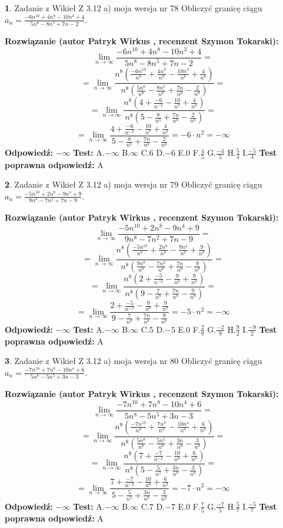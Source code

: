 \documentclass[12pt, a4paper]{article}
\theoremstyle{definition} %
\newtheorem{zad}{}
\newcommand{\zadStart}[1]{\begin{zad}#1\newline}
\newcommand{\zadStop}{\end{zad}}
\newcommand{\rozwStart}[2]{\noindent \textbf{Rozwiązanie (autor #1 , recenzent #2): }\newline}
\newcommand{\rozwStop}{\newline}
\newcommand{\odpStart}{\noindent \textbf{Odpowiedź:}\newline}
\newcommand{\odpStop}{\newline}
\newcommand{\testStart}{\noindent \textbf{Test:}\newline}
\newcommand{\testStop}{\newline}
\newcommand{\kluczStart}{\noindent \textbf{Test poprawna odpowiedź:}\newline}
\newcommand{\kluczStop}{\newline}
\begin{document}
\zadStart{Zadanie z Wikieł Z 3.12 a) moja wersja nr 78}
Obliczyć granicę ciągu $a_{n}=\frac{-6n^{10}+4n^{8}-10n^{3}+4}{5n^{8}-8n^{5}+7n-2}$.
\zadStop
\rozwStart{Patryk Wirkus}{Szymon Tokarski}
$$\lim\limits_{n\to\infty}\frac{-6n^{10}+4n^{8}-10n^{3}+4}{5n^{8}-8n^{5}+7n-2}=$$
$$=\lim\limits_{n\to\infty}\frac{n^{8}\left(\frac{-6n^{10}}{n^{8}}+\frac{4n^{8}}{n^{8}}-\frac{10n^{3}}{n^{8}}+\frac{4}{n^{8}}\right)}{n^{8}\left(\frac{5n^{8}}{n^{8}}-\frac{8n^{5}}{n^{8}}+\frac{7n}{n^{8}}-\frac{2}{n^{8}}\right)}=$$
$$=\lim\limits_{n\to\infty}\frac{n^{8}\left(4+\frac{-6}{n^{-2}}-\frac{10}{n^{7}}+\frac{4}{n^{8}}\right)}
{n^{8}\left(5-\frac{8}{n^{5}}+\frac{7n}{n^{8}}-\frac{2}{n^{8}}\right)}=$$
$$=\lim\limits_{n\to\infty}\frac{4+\frac{-6}{n^{-2}}-\frac{10}{n^{7}}+\frac{4}{n^{8}}}{5-\frac{8}{n^{5}}+\frac{7n}{n^{8}}-\frac{2}{n^{8}}}=-6\cdot n^{2} = -\infty$$
\rozwStop
\odpStart
$-\infty$
\odpStop
\testStart
A.$-\infty$
B.$\infty$
C.$6$
D.$-6$
E.$0$
F.$\frac{4}{5}$
G.$\frac{-4}{5}$
H.$\frac{5}{4}$
I.$\frac{-5}{4}$
\testStop
\kluczStart
A
\kluczStop



\zadStart{Zadanie z Wikieł Z 3.12 a) moja wersja nr 79}
Obliczyć granicę ciągu $a_{n}=\frac{-5n^{10}+2n^{8}-9n^{4}+9}{9n^{8}-7n^{2}+7n-9}$.
\zadStop
\rozwStart{Patryk Wirkus}{Szymon Tokarski}
$$\lim\limits_{n\to\infty}\frac{-5n^{10}+2n^{8}-9n^{4}+9}{9n^{8}-7n^{2}+7n-9}=$$
$$=\lim\limits_{n\to\infty}\frac{n^{8}\left(\frac{-5n^{10}}{n^{8}}+\frac{2n^{8}}{n^{8}}-\frac{9n^{4}}{n^{8}}+\frac{9}{n^{8}}\right)}{n^{8}\left(\frac{9n^{8}}{n^{8}}-\frac{7n^{2}}{n^{8}}+\frac{7n}{n^{8}}-\frac{9}{n^{8}}\right)}=$$
$$=\lim\limits_{n\to\infty}\frac{n^{8}\left(2+\frac{-5}{n^{-2}}-\frac{9}{n^{6}}+\frac{9}{n^{8}}\right)}
{n^{8}\left(9-\frac{7}{n^{8}}+\frac{7n}{n^{8}}-\frac{9}{n^{8}}\right)}=$$
$$=\lim\limits_{n\to\infty}\frac{2+\frac{-5}{n^{-2}}-\frac{9}{n^{6}}+\frac{9}{n^{8}}}{9-\frac{7}{n^{8}}+\frac{7n}{n^{8}}-\frac{9}{n^{8}}}=-5\cdot n^{2} = -\infty$$
\rozwStop
\odpStart
$-\infty$
\odpStop
\testStart
A.$-\infty$
B.$\infty$
C.$5$
D.$-5$
E.$0$
F.$\frac{2}{9}$
G.$\frac{-2}{9}$
H.$\frac{9}{2}$
I.$\frac{-9}{2}$
\testStop
\kluczStart
A
\kluczStop



\zadStart{Zadanie z Wikieł Z 3.12 a) moja wersja nr 80}
Obliczyć granicę ciągu $a_{n}=\frac{-7n^{10}+7n^{8}-10n^{4}+6}{5n^{8}-5n^{5}+3n-3}$.
\zadStop
\rozwStart{Patryk Wirkus}{Szymon Tokarski}
$$\lim\limits_{n\to\infty}\frac{-7n^{10}+7n^{8}-10n^{4}+6}{5n^{8}-5n^{5}+3n-3}=$$
$$=\lim\limits_{n\to\infty}\frac{n^{8}\left(\frac{-7n^{10}}{n^{8}}+\frac{7n^{8}}{n^{8}}-\frac{10n^{4}}{n^{8}}+\frac{6}{n^{8}}\right)}{n^{8}\left(\frac{5n^{8}}{n^{8}}-\frac{5n^{5}}{n^{8}}+\frac{3n}{n^{8}}-\frac{3}{n^{8}}\right)}=$$
$$=\lim\limits_{n\to\infty}\frac{n^{8}\left(7+\frac{-7}{n^{-2}}-\frac{10}{n^{6}}+\frac{6}{n^{8}}\right)}
{n^{8}\left(5-\frac{5}{n^{5}}+\frac{3n}{n^{8}}-\frac{3}{n^{8}}\right)}=$$
$$=\lim\limits_{n\to\infty}\frac{7+\frac{-7}{n^{-2}}-\frac{10}{n^{6}}+\frac{6}{n^{8}}}{5-\frac{5}{n^{5}}+\frac{3n}{n^{8}}-\frac{3}{n^{8}}}=-7\cdot n^{2} = -\infty$$
\rozwStop
\odpStart
$-\infty$
\odpStop
\testStart
A.$-\infty$
B.$\infty$
C.$7$
D.$-7$
E.$0$
F.$\frac{7}{5}$
G.$\frac{-7}{5}$
H.$\frac{5}{7}$
I.$\frac{-5}{7}$
\testStop
\kluczStart
A
\kluczStop
\end{document}
